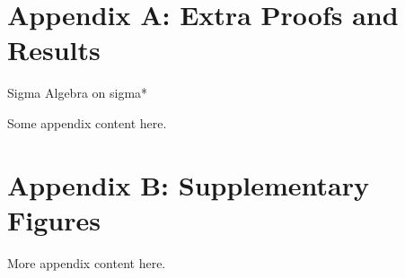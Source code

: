 \documentclass[12pt, twoside]{article}
\theoremstyle{spaceddefn}
\begin{document}
\newpage

\section*{Appendix A: Extra Proofs and Results}

Sigma Algebra on sigma*


Some appendix content here.

\section*{Appendix B: Supplementary Figures}

More appendix content here.

\newpage
\printbibliography
{}
\end{document}
